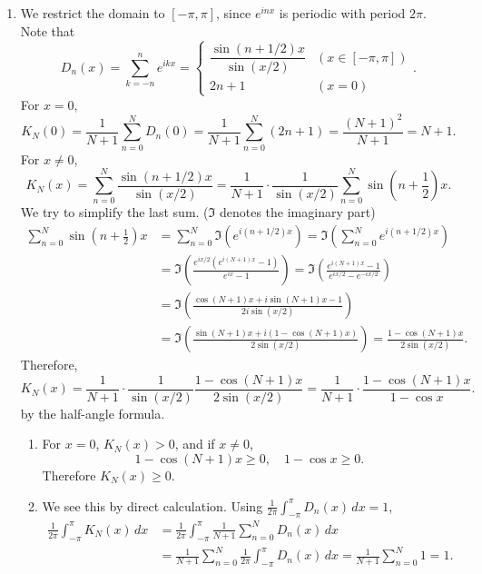 \documentclass[12pt]{report}
\newcommand{\numl}[1]{\item[\large\textbf{\sffamily #1.}]}
\newcommand{\num}[1]{\item[\textbf{\sffamily #1}]}
\newcommand{\ds}{\displaystyle}
\newcommand{\paren}[1]{\left( #1 \right)}
\renewcommand{\d}[1]{\,d{#1}}
\begin{document}
\begin{enumerate}
    \pagebreak

    \numl{3} We restrict the domain to \([-\pi, \pi]\), since \(e^{inx}\) is periodic with period \(2\pi\). Note that
    \[ \tag{\(\star\)}
        D_n(x) = \sum_{k=-n}^n e^{ikx} = \begin{cases}
            \dfrac{\sin (n + 1/2)x}{\sin (x/2)} & (x \in [-\pi, \pi]) \\
            2n+1                                & (x = 0)
        \end{cases}.
    \]
    For \(x = 0\),
    \[
        K_N(0) = \frac{1}{N+1}\sum_{n=0}^N D_n(0) =\frac{1}{N+1}\sum_{n=0}^N (2n+1) = \frac{(N+1)^2}{N+1} = N+1.
    \]
    For \(x \neq 0\),
    \[
        K_N(x) = \sum_{n=0}^N \frac{\sin (n+1/2)x}{\sin (x/2)} = \frac{1}{N+1}\cdot \frac{1}{\sin (x/2)} \sum_{n=0}^N \sin \paren{n+\frac{1}{2}}x.
    \]
    We try to simplify the last sum. (\(\Im\) denotes the imaginary part)
    \[
        \begin{aligned}
            \sum_{n=0}^N \sin \paren{n+\frac{1}{2}}x & =\sum_{n=0}^N \Im\paren{e^{i(n+1/2)x}} = \Im\paren{\sum_{n=0}^N e^{i(n+1/2)x}}                                                    \\
                                                     & = \Im \paren{\frac{e^{ix/2} \left(e^{i(N+1)x} - 1\right)}{e^{ix} - 1}} = \Im \paren{\frac{e^{i(N+1)x} - 1}{e^{ix/2} - e^{-ix/2}}} \\
                                                     & = \Im\paren{\frac{\cos(N+1)x + i\sin(N+1)x - 1}{2i\sin(x/2)}}                                                                     \\
                                                     & = \Im\paren{\frac{\sin(N+1)x + i(1-\cos(N+1)x)}{2\sin(x/2)}} = \frac{1 - \cos(N+1)x}{2\sin(x/2)}.
        \end{aligned}
    \]
    Therefore,
    \[
        K_N(x) = \frac{1}{N+1} \cdot \frac{1}{\sin(x/2)} \frac{1 - \cos(N+1)x}{2\sin(x/2)} = \frac{1}{N+1} \cdot \frac{1-\cos(N+1)x}{1 - \cos x}.
    \]
    by the half-angle formula.

    \begin{enumerate}
        \num{(a)} For \(x = 0\), \(K_N(x) > 0\), and if \(x \neq 0\),
        \[
            1 - \cos(N+1)x \geq 0, \quad 1 - \cos x \geq 0.
        \]
        Therefore \(K_N(x) \geq 0\).

        \num{(b)} We see this by direct calculation. Using \(\ds \frac{1}{2\pi} \int_{-\pi}^\pi D_n(x)\d{x} = 1\),
        \[
            \begin{aligned}
                \frac{1}{2\pi} \int_{-\pi}^\pi K_N(x) \d{x} & = \frac{1}{2\pi} \int_{-\pi}^\pi \frac{1}{N+1}\sum_{n=0}^N D_n(x) \d{x}                                    \\
                                                            & = \frac{1}{N+1} \sum_{n=0}^N \frac{1}{2\pi}\int_{-\pi}^\pi D_n(x)\d{x} = \frac{1}{N+1} \sum_{n=0}^N 1 = 1.
            \end{aligned}
        \]


\end{enumerate}
\end{enumerate}
\end{document}
